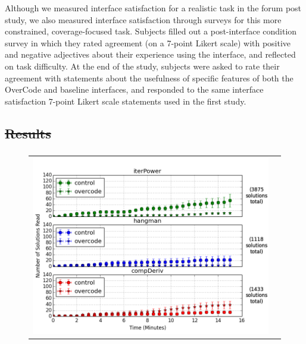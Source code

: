 \documentclass[12pt,twoside]{mitthesis}
\providecommand{\DIFaddtex}[1]{{\protect\color{blue}\uwave{#1}}} %
\providecommand{\DIFdeltex}[1]{{\protect\color{red}\sout{#1}}}                      %
\providecommand{\DIFaddbegin}{} %
\providecommand{\DIFaddend}{} %
\providecommand{\DIFdelbegin}{} %
\providecommand{\DIFdelend}{} %
\providecommand{\DIFadd}[1]{\texorpdfstring{\DIFaddtex{#1}}{#1}} %
\providecommand{\DIFdel}[1]{\texorpdfstring{\DIFdeltex{#1}}{}} %
\begin{document}
{{{{{{{{{{%
\DIFdelend \DIFaddbegin {\bf \DIFadd{Surveys}} \DIFaddend Although we measured interface satisfaction for a realistic task in the forum post study, we also measured interface satisfaction through surveys for this more constrained, coverage-focused task. Subjects filled out a post-interface condition survey in which they rated agreement (on a 7-point Likert scale) with positive and negative adjectives about their experience using the interface, and reflected on task difficulty. At the end of the study, subjects were asked to rate their agreement with statements about the usefulness of specific features of both the OverCode and baseline interfaces, and responded to the same interface satisfaction 7-point Likert scale statements used in the first study.

\DIFdelbegin \subsection{\DIFdel{Results}} %
\addtocounter{subsection}{-1}%
\DIFdelend \DIFaddbegin \subsubsection{\DIFadd{Results}} \DIFaddend \label{coverageResults}
\begin{figure}[b!]
\begin{tabular}{c | c}
\begin{minipage}{.5\linewidth}
\centering
\includegraphics[width=\linewidth]{Body/figures/overcode/prettyReadCoverage.png}
\end{minipage}
&

\end{tabular}
\end{figure}}}}}}}}}}}
\end{document}
